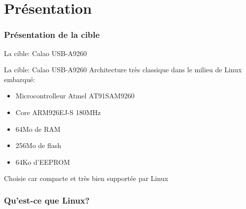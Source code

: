 %
%
%

\part{Présentation}

\section{Présentation de la cible}
\begin{frame}{La cible: Calao USB-A9260}
  \begin{center}
    \hspace{1cm}
  \end{center}
\end{frame}

\begin{frame}{La cible: Calao USB-A9260}
  Architecture très classique dans le milieu de Linux embarqué:
  \begin{itemize}
  \item Microcontrolleur Atmel AT91SAM9260
  \item Core ARM926EJ-S 180MHz
  \item 64Mo de RAM
  \item 256Mo de flash
  \item 64Ko d'EEPROM
  \end{itemize}
  Choisie car compacte et très bien supportée par Linux
\end{frame}

\section{Qu'est-ce que Linux?}

